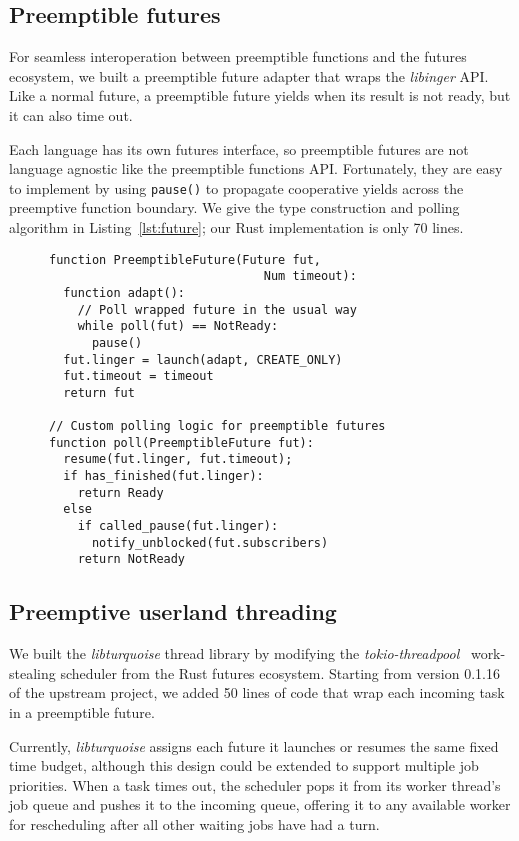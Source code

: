 \subsection{Preemptible futures}

For seamless interoperation between preemptible functions and the futures ecosystem,
we built a preemptible future adapter that wraps the \textit{libinger} API.  Like a
normal future, a preemptible future yields when its result is not ready, but it can
also time out.

Each language has its own futures interface, so preemptible futures are not language
agnostic like the preemptible functions API.  Fortunately, they are easy to implement
by using
\texttt{pause()} to propagate cooperative yields across the preemptive function
boundary.  We give the type construction and polling algorithm in
Listing~\ref{lst:future}; our Rust implementation is only 70 lines.

\begin{figure}
\begin{lstlisting}[label=lst:future,caption=Futures adapter type (pseudocode)]
function PreemptibleFuture(Future fut,
                              Num timeout):
  function adapt():
    // Poll wrapped future in the usual way
    while poll(fut) == NotReady:
      pause()
  fut.linger = launch(adapt, CREATE_ONLY)
  fut.timeout = timeout
  return fut

// Custom polling logic for preemptible futures
function poll(PreemptibleFuture fut):
  resume(fut.linger, fut.timeout);
  if has_finished(fut.linger):
    return Ready
  else
    if called_pause(fut.linger):
      notify_unblocked(fut.subscribers)
    return NotReady
\end{lstlisting}
\end{figure}


\subsection{Preemptive userland threading}

We built the \textit{libturquoise} thread library by modifying the
\textit{tokio-threadpool}~\cite{www-tokio-threadpool} work-stealing scheduler from
the Rust futures ecosystem.  Starting from version 0.1.16 of the upstream project, we
added 50 lines of code that wrap each incoming task in a preemptible future.

Currently, \textit{libturquoise} assigns each future it launches or resumes the same
fixed time budget, although this design could be extended to support
multiple job priorities.  When a task times out, the scheduler pops it from its
worker thread's job queue and pushes it to the incoming queue,
offering it to any available worker for rescheduling after all other waiting jobs
have had a turn.
